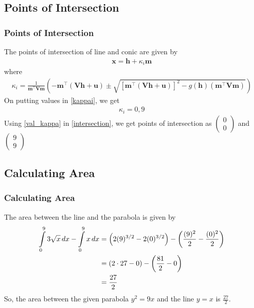 \documentclass{beamer}
\providecommand{\sbrak}[1]{\ensuremath{{}\left[#1\right]}}
\providecommand{\brak}[1]{\ensuremath{\left(#1\right)}}
\theoremstyle{remark}
\newcommand{\myvec}[1]{\ensuremath{\begin{pmatrix}#1\end{pmatrix}}}
\let\vec\mathbf
\numberwithin{equation}{section}
\begin{document}
\subsection{Points of Intersection}
\begin{frame}
  \frametitle{Points of Intersection}
  The points of intersection of line and conic are given by
  \begin{align}
    \vec{x} = \vec{h} + \kappa_i \vec{m} \label{intersection}
  \end{align}
  where
  \begin{align}
    \kappa_{i} = \frac{1}{\vec{m}^{\top} \vec{V} \vec{m}} \brak{-\vec{m}^\top \brak{\vec{V} \vec{h} + \vec{u}} \pm \sqrt{\sbrak{\vec{m}^\top \brak{\vec{V} \vec{h} + \vec{u}}}^2 - g\brak{\vec{h}} \brak{\vec{m}^\top \vec{V} \vec{m}}}} \label{kappai}
  \end{align}
  On putting values in \ref{kappai}, we get 
  \begin{align}
    \kappa _ i = 0 , 9 \label{val_kappa}
  \end{align}
  Using \ref{val_kappa} in \ref{intersection}, we get points of intersection as $\myvec{0\\0}$ and $\myvec{9\\9}$
\end{frame}

\subsection{Calculating Area}
\begin{frame}
  \frametitle{Calculating Area}
  The area between the line and the parabola is given by
  \begin{align}
    \int \limits_0^9 3 \sqrt{x} \,dx - \int \limits_0^9 x \,dx  &= \brak{2 (9)^{3/2} - 2 (0)^{3/2}} - \brak{\frac{(9)^2}{2} - \frac{(0)^2}{2}} \notag \\
    &= \brak{2 \cdot 27 - 0} - \brak{\frac{81}{2} - 0} \notag \\
    &= \frac{27}{2} \label{final}
  \end{align}
  So, the area between the given parabola $y^2 = 9x$ and the line $y=x$ is $\frac{27}{2}$.
\end{frame}
\end{document}
